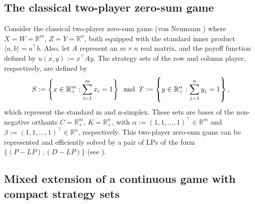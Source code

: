 \documentclass[11pt, twoside]{article}
\numberwithin{equation}{section}
\theoremstyle{definition}
\begin{document}
\vspace{-0.1cm}\subsection{The classical two-player zero-sum game}\vspace{-0.2cm}

Consider the classical two-player zero-sum game (von Neumann \cite{Neumann1928}) where $X=W=\mathbb{R}^{m}$, $Z=Y=\mathbb{R}^{n}$, both equipped with the standard inner product $\langle a,b\rangle=a^{\top}b$. Also, let $A$ represent an $m\times n$ real matrix, and the payoff function defined by $u(x,y):= x^{\top}Ay$. The strategy sets of the row and column player, respectively, are defined by 
\begin{equation*}
    S:= \left\{x\in\mathbb{R}^{m}_{+}:\sum_{i=1}^{m}x_i=1\right\} \mbox{\;\;and\;\;} T:= \left\{y\in\mathbb{R}^{n}_{+}:\sum_{j=1}^{n}y_j=1\right\},
\end{equation*}
 which represent the standard m and n-simplex. These sets are bases of the non-negative orthants $C=\mathbb{R}^{m}_{+}$, $K=\mathbb{R}^{n}_{+}$, with $\alpha:= (1,1,...,1)^\top\in\mathbb{R}^{m}$ and $\beta:= (1,1,...,1)^\top\in\mathbb{R}^{n}$, respectively. This two-player zero-sum game can be represented and efficiently solved by a pair of LPs of the form \hyperlink{LPS}{$\{(P-LP),(D-LP)\}$} (see \cite{dantzig2016linear, karmarkar1984new, nesterov1994interior}).


\vspace{-0.1cm}\subsection{Mixed extension of a continuous game with compact strategy sets}\vspace{-0.2cm}
\end{document}
